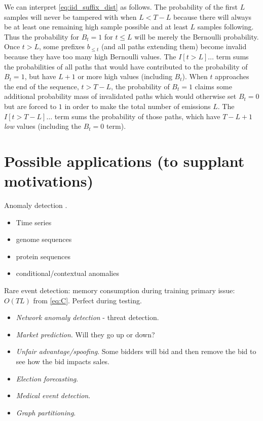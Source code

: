 \documentclass{article}
\begin{document}
We can interpret \cref{eq:iid_suffix_dist} as follows. The probability of the
first $L$ samples will never be tampered with when $L < T - L$ because there
will always be at least one remaining high sample possible and at least $L$
samples following. Thus the probability for $B_t = 1$ for $t \leq L$ will be
merely the Bernoulli probability. Once $t > L$, some prefixes $b_{\leq t}$ (and
all paths extending them) become invalid because they have too many high
Bernoulli values. The $I[t > L]\ldots$ term sums the probabilities of all paths
that would have contributed to the probability of $B_t=1$, but have $L + 1$ or
more high values (including $B_t$). When $t$ approaches the end of the
sequence, $t > T - L$, the probability of $B_t=1$ claims some additional
probability mass of invalidated paths which would otherwise set $B_t=0$ but are
forced to $1$ in order to make the total number of emissions $L$. The $I[t > T
- L]\ldots$ term sums the probability of those paths, which have $T - L + 1$
\emph{low} values (including the $B_t=0$ term).

\section{Possible applications (to supplant motivations)}

Anomaly detection \cite{chandolaAnomalyDetectionSurvey2009}.
\begin{itemize}
    \item Time series
    \item genome sequences
    \item protein sequences
    \item conditional/contextual anomalies
\end{itemize}
Rare event detection: memory consumption during training primary issue: $O(TL)$
from \cref{eq:C}. Perfect during testing.

\begin{itemize}
\item   \emph{Network anomaly detection} - threat detection.
\item   \emph{Market prediction}. Will they go up or down?
\item   \emph{Unfair advantage/spoofing}. Some bidders will bid and then remove
        the bid to see how the bid impacts sales.
\item   \emph{Election forecasting}.
\item   \emph{Medical event detection}.
\item   \emph{Graph partitioning}.
\end{itemize}
\end{document}
